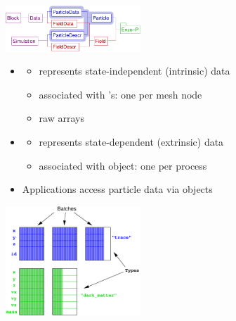 \NEWSEC

\subsection{\ssParticles}

\begin{frame}[fragile,label=ss-particles] 
\secframetitle{\ssParticles}
\ \\
\includegraphics[width=2in]{data-classes-particle.pdf}

\begin{itemize}
\item {}
\begin{itemize}
\item represents state-independent (intrinsic) data
\item associated with 's: one per mesh node
\item raw arrays
\end{itemize}
\item {}
\begin{itemize}
\item represents state-dependent (extrinsic) data
\item associated with  object: one per process
\end{itemize}
\item Applications access particle data via  objects
\end{itemize}
\end{frame}


\begin{frame}[fragile,label=ss-particles] 
\secframetitle{\ssParticles}
\includegraphics[width=2.0in]{particles-design.pdf} \ \\
\end{frame}

